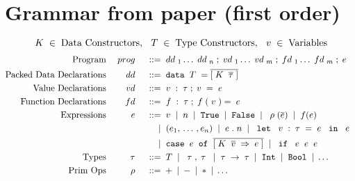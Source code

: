 \documentclass[12pt]{article}
\newcommand{\gramdef}{\; ::= \;}
\newcommand{\gramor}{\; | \;}
\newcommand{\PROG}{\keywd{prog}}
\newcommand{\EXPR}{\keywd{e}}
\newcommand{\PRIM}{\keywd{\rho}}
\newcommand{\TYP}{\keywd{\tau}}
\newcommand{\ARROW}{\rightarrow}
\newcommand{\DD}{\keywd{dd}}
\newcommand{\VD}{\keywd{vd}}
\newcommand{\FD}{\keywd{fd}}
\newcommand{\TC}{\keywd{T}}
\newcommand{\DC}{\keywd{K}}
\newcommand{\DATA}{\gramwd{data}}
\newcommand{\sTYP}{\skeywd{\tau}}
\newcommand{\sEXPR}{\skeywd{e}}
\newcommand{\NEEDS}[2]{\; Needs(#1,#2) \;}
\newcommand{\HAS}[1]{\; Has(#1) \;}
\newcommand{\skeywd}[1]{#1}
\newcommand{\keywd}[1]{\; {#1} \;}
\newcommand{\gramwd}[1]{\; \texttt{#1} \;}
\newcommand{\pairtype}[2]{\; {#1}, {#2} \;}
\newcommand{\case}[2]{\gramwd{case}\; #1\; \gramwd{of}\; #2 \;}
\newcommand{\pair}[2]{\; ({#1} \,,\, {#2}) \;}
\newcommand{\fst}[1]{\; \gramwd{fst} \; {#1} \;}
\newcommand{\snd}[1]{\; \gramwd{snd} \; {#1} \;}
\newcommand{\bind}[2]{{#1} \Rightarrow {#2}}
\newcommand{\var}{\; \svar \;}
\newcommand{\svar}{v}
\newcommand{\fvar}{\; \sfvar \;}
\newcommand{\sfvar}{f}
\newcommand{\num}{\; n \;}
\newcommand{\primexpr}[1]{\; \PRIM(#1) \;}
\newcommand{\letexpr}[3]{\;\gramwd{let} \; #1 = #2 \; \gramwd{in} \; #3 \;}
\newcommand{\ife}[3]{\; \gramwd{if}\; #1 #2 #3 \;}
\newcommand{\app}[2]{\; #1(#2) \;}
\begin{document}
\maketitle

\section{Grammar from paper (first order)}

\begin{displaymath}
    \DC \in \; \textup{Data Constructors}, \:\: \TC \in \; \textup{Type Constructors}, \:\: \var \in \; \textup{Variables}
\end{displaymath} 
\begin{displaymath}
    \begin{aligned}
      \textup{Program} && \PROG && \gramdef & \DD_1 \ldots \DD_n \; ; 
                          \VD_1 \ldots \VD_m \; ; \FD_1 \ldots \FD_m \; ; \EXPR \\
      \textup{Packed Data Declarations} && \DD && \gramdef & \DATA \TC = \overline{[\DC \; \overline{\sTYP}\;]} \\
      \textup{Value Declarations}    && \VD && \gramdef & \var : \TYP  ; \var = \EXPR \\ 
      \textup{Function Declarations} && \FD && \gramdef & \fvar : \TYP ; \fvar(\var) = \EXPR \\ 
      \textup{Expressions} && \EXPR && \gramdef & \var \gramor \num \gramor \gramwd{True} \gramor \gramwd{False}
                                  \gramor \primexpr{\overline{\sEXPR}} \gramor 
       \app{f}{\sEXPR} \\
      && && \gramor & 
      \;(e_1,\, \dots\, , e_n)\; \gramor \EXPR.\num 
      \gramor \letexpr{\var:\TYP}{\EXPR}{\EXPR} \\
      && && \gramor & \case{\sEXPR}{\overline{[\bind{\DC \; \overline{\svar} \;}{\EXPR}]}} \gramor  \ife{\EXPR}{\EXPR}{\EXPR} \\
      \textup{Types} && \TYP && \gramdef &
      \TC \gramor \pairtype{\TYP}{\TYP} \gramor \TYP \ARROW \TYP
      \gramor \gramwd{Int} \gramor \gramwd{Bool} \gramor \dots
      \\
      \textup{Prim Ops} && \PRIM && \gramdef & + \gramor - \gramor * \gramor \ldots \\
    \end{aligned}
\end{displaymath}
\end{document}
